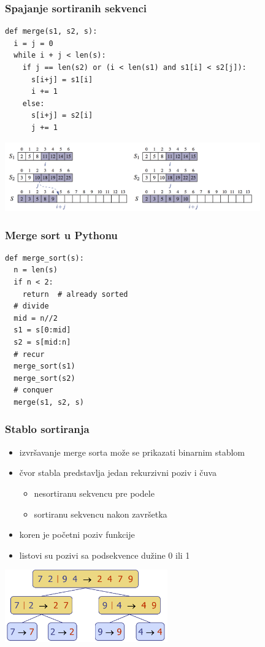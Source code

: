 \documentclass[compress]{beamer}
\begin{document}
\begin{frame}
  \frametitle{Spajanje sortiranih sekvenci}
\begin{verbatim}
def merge(s1, s2, s):
  i = j = 0
  while i + j < len(s):
    if j == len(s2) or (i < len(s1) and s1[i] < s2[j]):
      s[i+j] = s1[i]
      i += 1
    else:
      s[i+j] = s2[i]
      j += 1
\end{verbatim}
\includegraphics[width=11cm]{asp-12-pic01.png}
\end{frame}

\begin{frame}
  \frametitle{Merge sort u Pythonu}
\begin{verbatim}
def merge_sort(s):
  n = len(s)
  if n < 2:
    return  # already sorted
  # divide
  mid = n//2
  s1 = s[0:mid]
  s2 = s[mid:n]
  # recur
  merge_sort(s1)
  merge_sort(s2)
  # conquer
  merge(s1, s2, s)
\end{verbatim}
\end{frame}

\begin{frame}[fragile]
  \frametitle{Stablo sortiranja}
  \begin{itemize}
    \item izvršavanje merge sorta može se prikazati binarnim stablom
    \item čvor stabla predstavlja jedan rekurzivni poziv i čuva
    \begin{itemize}
      \item nesortiranu sekvencu pre podele
      \item sortiranu sekvencu nakon završetka
    \end{itemize}
    \item koren je početni poziv funkcije
    \item listovi su pozivi sa podsekvence dužine 0 ili 1
  \end{itemize}
  \begin{center}
    \includegraphics[width=7cm]{asp-12-pic02.png}
  \end{center}
\end{frame}
  
\end{document}
